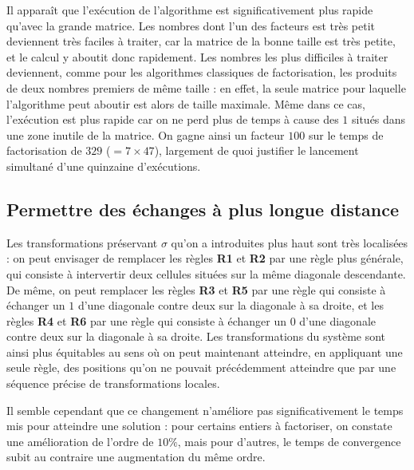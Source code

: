 \documentclass[11pt, openany]{article}
\begin{document}
\medskip
Il apparaît que l'exécution de l'algorithme est significativement plus rapide qu'avec la grande matrice. Les nombres dont l'un des facteurs est très petit deviennent très faciles à traiter, car la matrice de la bonne taille est très petite, et le calcul y aboutit donc rapidement. Les nombres les plus difficiles à traiter deviennent, comme pour les algorithmes classiques de factorisation, les produits de deux nombres premiers de même taille : en effet, la seule matrice pour laquelle l'algorithme peut aboutir est alors de taille maximale. Même dans ce cas, l'exécution est plus rapide car on ne perd plus de temps à cause des $1$ situés dans une zone inutile de la matrice. On gagne ainsi un facteur $100$ sur le temps de factorisation de $329$ ($ =7\times 47$), largement de quoi justifier le lancement simultané d'une quinzaine d'exécutions. %


\subsection*{Permettre des échanges à plus longue distance}

Les transformations préservant $\sigma$ qu'on a introduites plus haut sont très localisées : on peut envisager de remplacer les règles \textbf{R1} et \textbf{R2} par une règle plus générale, qui consiste à intervertir deux cellules situées sur la même diagonale descendante. De même, on peut remplacer les règles \textbf{R3} et \textbf{R5} par une règle qui consiste à échanger un $1$ d'une diagonale contre deux sur la diagonale à sa droite, et les règles \textbf{R4} et \textbf{R6} par une règle qui consiste à échanger un $0$ d'une diagonale contre deux sur la diagonale à sa droite. Les transformations du système sont ainsi plus équitables au sens où on peut maintenant atteindre, en appliquant une seule règle, des positions qu'on ne pouvait précédemment atteindre que par une séquence précise de transformations locales. 

Il semble cependant que ce changement n'améliore pas significativement le temps mis pour atteindre une solution : pour certains entiers à factoriser, on constate une amélioration de l'ordre de $10\%$, mais pour d'autres, le temps de convergence subit au contraire une augmentation du même ordre.   

\end{document}
